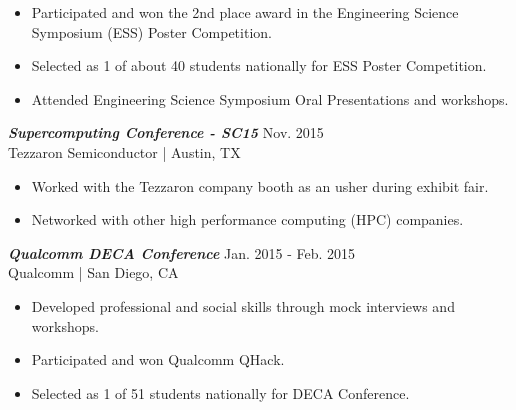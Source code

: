 \documentclass[letter]{res}
\begin{document}
\begin{resume}
 \vspace{-4mm}

 \begin{itemize}
 \item Participated and won the 2nd place award in the Engineering Science Symposium (ESS) Poster Competition.
 \item Selected as 1 of about 40 students nationally for ESS Poster Competition.
 \item Attended Engineering Science Symposium Oral Presentations and workshops.
 \end{itemize}
 
\vspace{-2mm}

{\sl \textbf{Supercomputing Conference - SC15}} \hfill Nov. 2015\\
Tezzaron Semiconductor | Austin, TX \newline

 \vspace{-4mm}

 \begin{itemize}
 \item Worked with the Tezzaron company booth as an usher during exhibit fair.
 \item Networked with other high performance computing (HPC) companies.
 \end{itemize}
 
\vspace{-2mm}

{\sl \textbf{Qualcomm DECA Conference}} \hfill Jan. 2015 - Feb. 2015\\
Qualcomm | San Diego, CA \newline

 \vspace{-4mm}

 \begin{itemize}
 \item Developed professional and social skills through mock interviews and workshops.
 \item Participated and won Qualcomm QHack.
 \item Selected as 1 of 51 students nationally for DECA Conference.
 \end{itemize}
 
\vspace{-2mm}
 


\end{resume}
\end{document}
